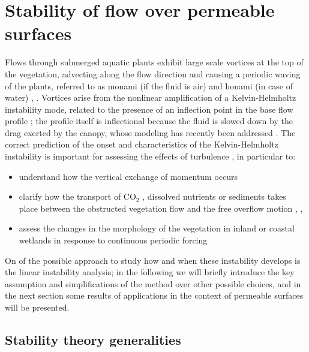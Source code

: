 \section{Stability of flow over permeable surfaces}
\label{sec:stability}

Flows through submerged aquatic plants exhibit large scale vortices at the top of the vegetation,
advecting along the flow direction and causing a periodic waving of the plants, referred to as
monami (if the fluid is air) and honami (in case of water) \citet{inoue1955studies}, \citet{ackerman1993reduced}.
Vortices arise from the nonlinear amplification of a Kelvin-Helmholtz instability mode, related to the presence of an inflection point in the base flow profile \citet{asaeda2005morphological}; the profile itself is inflectional because the fluid is slowed down by the drag exerted by the canopy, whose modeling has recently been addressed \citet{py2004mixing} \citet{singh2016linear}  \cite{zampogna2016instability}.
The correct prediction of the onset and characteristics of the Kelvin-Helmholtz instability is important for assessing the effects of turbulence \citet{finnigan2000turbulence} \citet{jimenez2001turbulent}, in particular to:
\begin{itemize}
	\item understand how the vertical exchange of momentum occurs \citet{ikeda1996three}
	\item clarify how the transport of $\text{CO}_2$ , dissolved nutrients or sediments takes place between the
	obstructed vegetation flow and the free overflow motion \citet{gambi1990flume}, \citet{eckman1987role}, \citet{grizzle1996hydrodynamically}
	\item assess the changes in the morphology of the vegetation in inland or coastal wetlands in
	response to continuous periodic forcing \citet{asaeda2005morphological} \citet{patil2010characteristics}
\end{itemize}

On of the possible approach to study how and when these instability develops is the linear instability analysis; in the following we will briefly introduce the key assumption and simplifications of the method over other possible choices, and in the next section some results of applications in the context of permeable surfaces will be presented.


\subsection{Stability theory generalities}

